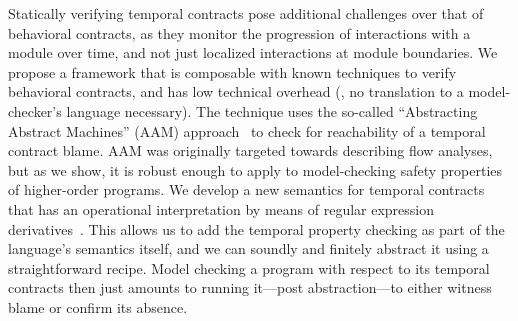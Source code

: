 Statically verifying temporal contracts pose additional challenges
over that of behavioral contracts, as they monitor the progression of
interactions with a module over time, and not just localized
interactions at module boundaries.
%
We propose a framework that is composable with known techniques to
verify behavioral contracts, and has low technical overhead (\eg, no
translation to a model-checker's language necessary).
%
The technique uses the so-called ``Abstracting Abstract Machines''
(AAM) approach~\citep{dvanhorn:VanHorn2010Abstracting} to check for
reachability of a temporal contract blame.
AAM was originally targeted towards describing flow analyses, but as
we show, it is robust enough to apply to model-checking safety
properties of higher-order programs.
%
We develop a new semantics for temporal contracts that has an operational interpretation by means of regular expression derivatives~\citep{ianjohnson:Brzozowski1964}.
%
This allows us to add the temporal property checking as part of the
language's semantics itself, and we can soundly and finitely abstract
it using a straightforward recipe.
%
Model checking a program with respect to its temporal contracts then
just amounts to running it---post abstraction---to either witness
blame or confirm its absence.


